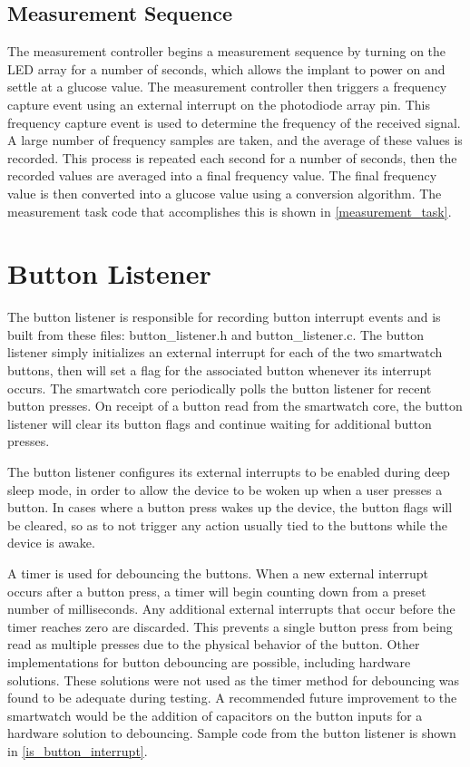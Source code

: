 \subsection{Measurement Sequence}
The measurement controller begins a measurement sequence by turning on the LED array for a number of seconds, which allows the implant to power on and settle at a glucose value. The measurement controller then triggers a frequency capture event using an external interrupt on the photodiode array pin. This frequency capture event is used to determine the frequency of the received signal. A large number of frequency samples are taken, and the average of these values is recorded. This process is repeated each second for a number of seconds, then the recorded values are averaged into a final frequency value. The final frequency value is then converted into a glucose value using a conversion algorithm. The measurement task code that accomplishes this is shown in \ref{measurement_task}.

\nl

\section{Button Listener}
The button listener is responsible for recording button interrupt events and is built from these files: button\_listener.h and button\_listener.c. The button listener simply initializes an external interrupt for each of the two smartwatch buttons, then will set a flag for the associated button whenever its interrupt occurs. The smartwatch core periodically polls the button listener for recent button presses. On receipt of a button read from the smartwatch core, the button listener will clear its button flags and continue waiting for additional button presses.

The button listener configures its external interrupts to be enabled during deep sleep mode, in order to allow the device to be woken up when a user presses a button. In cases where a button press wakes up the device, the button flags will be cleared, so as to not trigger any action usually tied to the buttons while the device is awake.

A timer is used for debouncing the buttons. When a new external interrupt occurs after a button press, a timer will begin counting down from a preset number of milliseconds. Any additional external interrupts that occur before the timer reaches zero are discarded. This prevents a single button press from being read as multiple presses due to the physical behavior of the button. Other implementations for button debouncing are possible, including hardware solutions\cite{debounce}. These solutions were not used as the timer method for debouncing was found to be adequate during testing. A recommended future improvement to the smartwatch would be the addition of capacitors on the button inputs for a hardware solution to debouncing. Sample code from the button listener is shown in \ref{is_button_interrupt}.
